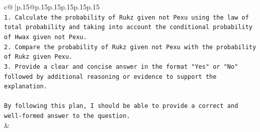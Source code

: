 \documentclass{article}
\begin{document}
{\begin{supertabular}{c@{$\;$}|p{.15\linewidth}@{}p{.15\linewidth}p{.15\linewidth}p{.15\linewidth}p{.15\linewidth}p{.15\linewidth}}
{{{\\ 
\texttt{1. Calculate the probability of Rukz given not Pexu using the law of total probability and taking into account the conditional probability of Hwax given not Pexu.} \\
\texttt{2. Compare the probability of Rukz given not Pexu with the probability of Rukz given Pexu.} \\
\texttt{3. Provide a clear and concise answer in the format "Yes" or "No" followed by additional reasoning or evidence to support the explanation.} \\
\\ 
\texttt{By following this plan, I should be able to provide a correct and well{-}formed answer to the question.} \\
            }
        }
    }
    & \\ \\

\end{supertabular}
}
\end{document}
